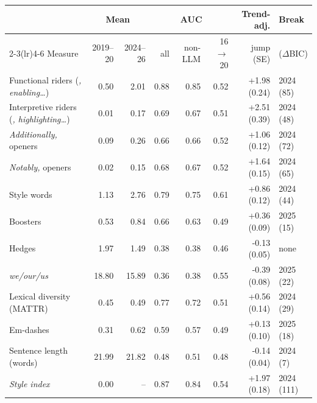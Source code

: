 \begin{tabular}{l rr rrr r l}
\toprule
& \multicolumn{2}{c}{Mean} & \multicolumn{3}{c}{AUC} & Trend-adj. & Break \\
\cmidrule(lr){2-3}\cmidrule(lr){4-6}
Measure & 2019--20 & 2024--26 & all & non-LLM & 16$\to$20 & jump (SE) & ($\Delta$BIC) \\
\midrule
Functional riders (\textit{, enabling\ldots}) & 0.50 & 2.01 & 0.88 & 0.85 & 0.52 & +1.98 (0.24) & 2024 (85) \\
Interpretive riders (\textit{, highlighting\ldots}) & 0.01 & 0.17 & 0.69 & 0.67 & 0.51 & +2.51 (0.39) & 2024 (48) \\
\textit{Additionally,} openers & 0.09 & 0.26 & 0.66 & 0.66 & 0.52 & +1.06 (0.12) & 2024 (72) \\
\textit{Notably,} openers & 0.02 & 0.15 & 0.68 & 0.67 & 0.52 & +1.64 (0.15) & 2024 (65) \\
Style words & 1.13 & 2.76 & 0.79 & 0.75 & 0.61 & +0.86 (0.12) & 2024 (44) \\
Boosters & 0.53 & 0.84 & 0.66 & 0.63 & 0.49 & +0.36 (0.09) & 2025 (15) \\
Hedges & 1.97 & 1.49 & 0.38 & 0.38 & 0.46 & -0.13 (0.05) & none \\
\textit{we/our/us} & 18.80 & 15.89 & 0.36 & 0.38 & 0.55 & -0.39 (0.08) & 2025 (22) \\
Lexical diversity (MATTR) & 0.45 & 0.49 & 0.77 & 0.72 & 0.51 & +0.56 (0.14) & 2024 (29) \\
Em-dashes & 0.31 & 0.62 & 0.59 & 0.57 & 0.49 & +0.13 (0.10) & 2025 (18) \\
Sentence length (words) & 21.99 & 21.82 & 0.48 & 0.51 & 0.48 & -0.14 (0.04) & 2024 (7) \\
\textit{Style index} & 0.00 & -- & 0.87 & 0.84 & 0.54 & +1.97 (0.18) & 2024 (111) \\
\bottomrule
\end{tabular}
